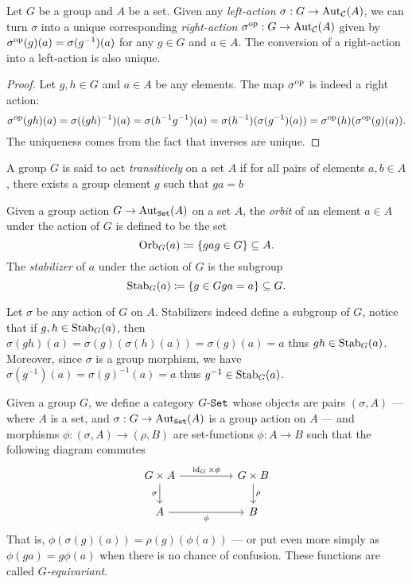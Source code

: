 \begin{proposition}
\label{prop:left-and-right-actions}
Let \(G\) be a group and \(A\) be a set. Given any \emph{left-action}
\(\sigma: G \to \operatorname{Aut}_{\mathcal C}(A)\), we can turn \(\sigma\) into a unique
corresponding \emph{right-action} \(\sigma^{\mathrm{op}}: G \to \operatorname{Aut}_{\mathcal C}(A)\) given
by \(\sigma^{\mathrm{op}}(g)(a) = \sigma(g^{-1})(a)\) for any \(g \in G\) and
\(a \in A\). The conversion of a right-action into a left-action is also unique.
\end{proposition}

\begin{proof}
Let \(g, h \in G\) and \(a \in A\) be any elements. The map \(\sigma^{\mathrm{op}}\) is
indeed a right action:
\[
\sigma^{\mathrm{op}}(g h)(a)
= \sigma((gh)^{-1})(a)
= \sigma(h^{-1} g^{-1})(a)
= \sigma(h^{-1})(\sigma(g^{-1})(a))
= \sigma^{\mathrm{op}}(h)(\sigma^{\mathrm{op}}(g)(a)).
\]
The uniqueness comes from the fact that inverses are unique.
\end{proof}

\begin{definition}
\label{def:transitive-action}
A group \(G\) is said to act \emph{transitively} on a set \(A\) if for all pairs
of elements \(a, b \in A\), there exists a group element \(g\) such that
\(g a = b\)
\end{definition}

\begin{definition}
\label{def:orbit-and-stabilizer}
Given a group action \(G \to \operatorname{Aut}_{{\texttt{Set}}}(A)\) on a set \(A\), the \emph{orbit}
of an element \(a \in A\) under the action of \(G\) is defined to be the
set
\[
\operatorname{Orb}_G(a) \coloneq \{g a \relax g \in G\} \subseteq A.
\]
The \emph{stabilizer} of \(a\) under the action of \(G\) is the subgroup
\[
\operatorname{Stab}_G(a) \coloneq \{g \in G \relax g a = a\} \subseteq G.
\]
\end{definition}

Let \(\sigma\) be any action of \(G\) on \(A\). Stabilizers indeed define a
subgroup of \(G\), notice that if \(g, h \in \operatorname{Stab}_G(a)\), then
\(\sigma(g h)(a) = \sigma(g)(\sigma(h)(a)) = \sigma(g)(a) = a\) thus
\(g h \in \operatorname{Stab}_G(a)\). Moreover, since \(\sigma\) is a group morphism, we have
\(\sigma(g^{-1})(a) = \sigma(g)^{-1}(a) = a\) thus \(g^{-1} \in
\operatorname{Stab}_G(a)\).

\begin{definition}
\label{def:G-set-category}
Given a group \(G\), we define a category \({{G}\text{-}{\texttt{Set}}}\) whose objects are pairs
\((\sigma, A)\) --- where \(A\) is a set, and \(\sigma: G \to \operatorname{Aut}_{{\texttt{Set}}}(A)\)
is a group action on \(A\) --- and morphisms \(\phi: (\sigma, A) \to (\rho, B)\)
are set-functions \(\phi: A \to B\) such that the following diagram commutes
\[
\begin{tikzcd}
G \times A \ar[d, "\sigma"'] \ar[rr, "\Id_G \times \phi"]
&&G \times B \ar[d, "\rho"] \\
A \ar[rr, "\phi"'] &&B
\end{tikzcd}
\]
That is, \(\phi(\sigma(g)(a)) = \rho(g)(\phi(a))\) --- or put even more simply
as \(\phi(g a) = g \phi(a)\) when there is no chance of confusion. These
functions are called \emph{\(G\)-equivariant}.
\end{definition}

